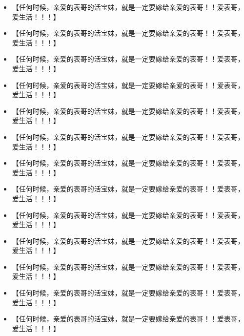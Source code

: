 \documentclass[9pt, b5paper]{article}
\begin{document}
\begin{itemize}
\item 【任何时候，亲爱的表哥的活宝妹，就是一定要嫁给亲爱的表哥！！爱表哥，爱生活！！！】
\item 【任何时候，亲爱的表哥的活宝妹，就是一定要嫁给亲爱的表哥！！爱表哥，爱生活！！！】
\item 【任何时候，亲爱的表哥的活宝妹，就是一定要嫁给亲爱的表哥！！爱表哥，爱生活！！！】
\item 【任何时候，亲爱的表哥的活宝妹，就是一定要嫁给亲爱的表哥！！爱表哥，爱生活！！！】
\item 【任何时候，亲爱的表哥的活宝妹，就是一定要嫁给亲爱的表哥！！爱表哥，爱生活！！！】
\item 【任何时候，亲爱的表哥的活宝妹，就是一定要嫁给亲爱的表哥！！爱表哥，爱生活！！！】
\item 【任何时候，亲爱的表哥的活宝妹，就是一定要嫁给亲爱的表哥！！爱表哥，爱生活！！！】
\item 【任何时候，亲爱的表哥的活宝妹，就是一定要嫁给亲爱的表哥！！爱表哥，爱生活！！！】
\item 【任何时候，亲爱的表哥的活宝妹，就是一定要嫁给亲爱的表哥！！爱表哥，爱生活！！！】
\item 【任何时候，亲爱的表哥的活宝妹，就是一定要嫁给亲爱的表哥！！爱表哥，爱生活！！！】
\item 【任何时候，亲爱的表哥的活宝妹，就是一定要嫁给亲爱的表哥！！爱表哥，爱生活！！！】
\item 【任何时候，亲爱的表哥的活宝妹，就是一定要嫁给亲爱的表哥！！爱表哥，爱生活！！！】
\item 【任何时候，亲爱的表哥的活宝妹，就是一定要嫁给亲爱的表哥！！爱表哥，爱生活！！！】
\end{itemize}
\end{document}
